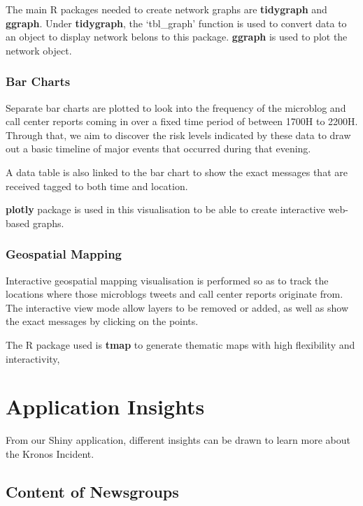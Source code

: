 \documentclass{acm_proc_article-sp}
\begin{document}
The main R packages needed to create network graphs are
\textbf{tidygraph} and \textbf{ggraph}. Under \textbf{tidygraph}, the
`tbl\_graph' function is used to convert data to an object to display
network belons to this package. \textbf{ggraph} is used to plot the
network object.

\hypertarget{bar-charts}{%
\subsubsection{Bar Charts}\label{bar-charts}}

Separate bar charts are plotted to look into the frequency of the
microblog and call center reports coming in over a fixed time period of
between 1700H to 2200H. Through that, we aim to discover the risk levels
indicated by these data to draw out a basic timeline of major events
that occurred during that evening.

A data table is also linked to the bar chart to show the exact messages
that are received tagged to both time and location.

\textbf{plotly} package is used in this visualisation to be able to
create interactive web-based graphs.

\hypertarget{geospatial-mapping}{%
\subsubsection{Geospatial Mapping}\label{geospatial-mapping}}

Interactive geospatial mapping visualisation is performed so as to track
the locations where those microblogs tweets and call center reports
originate from. The interactive view mode allow layers to be removed or
added, as well as show the exact messages by clicking on the points.

The R package used is \textbf{tmap} to generate thematic maps with high
flexibility and interactivity,

\hypertarget{application-insights}{%
\section{Application Insights}\label{application-insights}}

From our Shiny application, different insights can be drawn to learn
more about the Kronos Incident.

\hypertarget{content-of-newsgroups}{%
\subsection{Content of Newsgroups}\label{content-of-newsgroups}}
\end{document}
